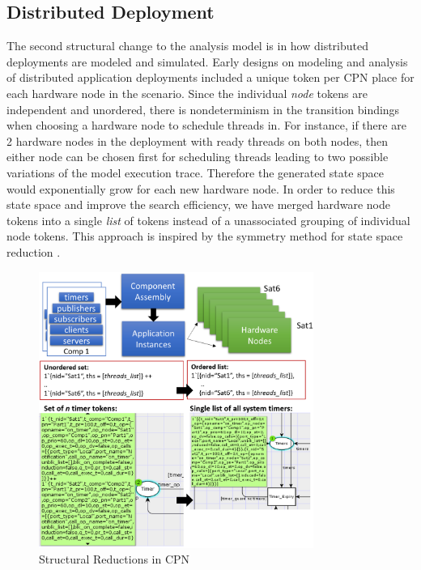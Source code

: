 \subsection{Distributed Deployment} 
\label{distributed_deployment}

The second structural change to the analysis model is in how distributed deployments are modeled and simulated. Early designs on modeling and analysis of distributed application deployments \cite{kumar2014colored} included a unique token per CPN place for each hardware node in the scenario. Since the individual \emph{node} tokens are independent and unordered, there is nondeterminism in the transition bindings when choosing a hardware node to schedule threads in. For instance, if there are 2 hardware nodes in the deployment with ready threads on both nodes, then either node can be chosen first for scheduling threads leading to two possible variations of the model execution trace. Therefore the generated state space would exponentially grow for each new hardware node. In order to reduce this state space and improve the search efficiency, we have merged hardware node tokens into a single \emph{list} of tokens instead of a unassociated grouping of individual node tokens. This approach is inspired by the symmetry method for state space reduction \cite{Kristensen2000}.

\begin{figure}[h]
	\centering
	\includegraphics[width=0.8\textwidth]{./img/dd}
	\caption{Structural Reductions in CPN}
	\label{fig:dd}
\end{figure}

